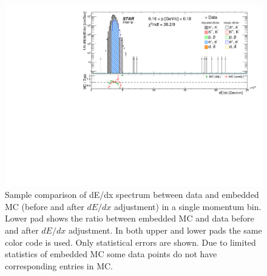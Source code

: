%
%
\begin{figure}[hb!]\vspace{-5pt}%
\centering%
\includegraphics[width=\linewidth,page=13]{graphics/dedx/dEdx_DataVsMC.pdf}\vspace{-5pt}%
\caption[Sample comparison of dE/dx spectrum between data and embedded MC in single momentum bin.]{Sample comparison of dE/dx spectrum between data and embedded MC (before and after $dE/dx$ adjustment) in a single momentum bin. Lower pad shows the ratio between embedded MC and data before and after $dE/dx$ adjustment. In both upper and lower pads the same color code is used. Only statistical errors are shown. Due to limited statistics of embedded MC some data points do not have corresponding entries in MC.}\label{fig:dEdxDataVsMCSingleBin}%
\end{figure}
%
